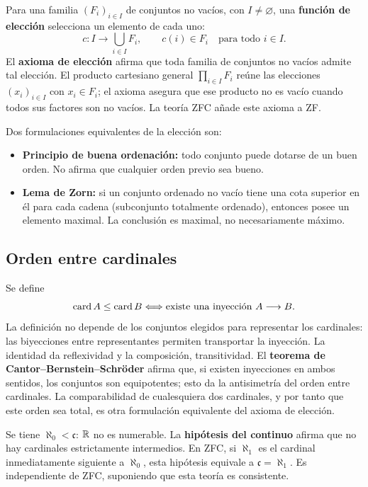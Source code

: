 Para una familia $(F_i)_{i\in I}$ de conjuntos no vacíos, con $I\ne\varnothing$,
una \textbf{función de elección} selecciona un elemento de cada uno:
\[
 c\colon I\longrightarrow\bigcup_{i\in I}F_i,
 \qquad c(i)\in F_i\quad\text{para todo }i\in I.
\]
El \textbf{axioma de elección} afirma que toda familia de conjuntos
no vacíos admite tal elección. El producto cartesiano general
$\prod_{i\in I}F_i$ reúne las elecciones $(x_i)_{i\in I}$ con $x_i\in F_i$;
el axioma asegura que ese producto no es vacío cuando todos sus factores
son no vacíos. La teoría ZFC añade este axioma a ZF.

Dos formulaciones equivalentes de la elección son:
\begin{itemize}
 \item \textbf{Principio de buena ordenación:} todo conjunto puede dotarse
       de un buen orden. No afirma que cualquier orden previo sea bueno.
 \item \textbf{Lema de Zorn:} si un conjunto ordenado no vacío tiene
       una cota superior en él para cada cadena (subconjunto totalmente
       ordenado), entonces posee un elemento maximal.
       La conclusión es maximal, no necesariamente máximo.
\end{itemize}
\subsection*{Orden entre cardinales}

Se define
\[
 \operatorname{card}A\le\operatorname{card}B
 \Longleftrightarrow\text{existe una inyección }A\longrightarrow B.
\]
La definición no depende de los conjuntos elegidos para representar los
cardinales: las biyecciones entre representantes permiten transportar
la inyección. La identidad da reflexividad y la composición, transitividad.
El \textbf{teorema de Cantor--Bernstein--Schröder} afirma que, si existen
inyecciones en ambos sentidos, los conjuntos son equipotentes;
esto da la antisimetría del orden entre cardinales.
La comparabilidad de cualesquiera dos cardinales, y por tanto que
este orden sea total, es otra formulación equivalente del axioma de elección.

Se tiene $\aleph_0<\mathfrak c$: $\mathbb{R}$ no es numerable.
La \textbf{hipótesis del continuo} afirma que no hay cardinales
estrictamente intermedios. En ZFC, si $\aleph_1$ es el cardinal
inmediatamente siguiente a $\aleph_0$, esta hipótesis equivale a
$\mathfrak c=\aleph_1$. Es independiente de ZFC, suponiendo que
esta teoría es consistente.

